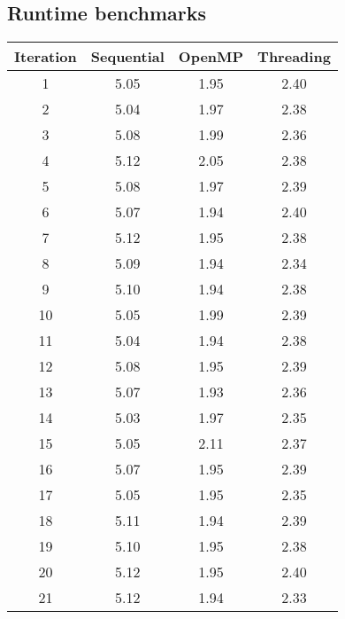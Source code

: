 \documentclass[a4paper]{article}
\begin{document}
        \subsection{Runtime benchmarks}
        \begin{minipage}{\textwidth}
            \centering
            \begin{tabular}{ c c c c }
                Iteration & Sequential & OpenMP & Threading \\
                \hline
                \hline
                        1 &       5.05 &   1.95 &      2.40 \\
                        2 &       5.04 &   1.97 &      2.38 \\
                        3 &       5.08 &   1.99 &      2.36 \\
                        4 &       5.12 &   2.05 &      2.38 \\
                        5 &       5.08 &   1.97 &      2.39 \\
                        6 &       5.07 &   1.94 &      2.40 \\
                        7 &       5.12 &   1.95 &      2.38 \\
                        8 &       5.09 &   1.94 &      2.34 \\
                        9 &       5.10 &   1.94 &      2.38 \\
                       10 &       5.05 &   1.99 &      2.39 \\
                       11 &       5.04 &   1.94 &      2.38 \\
                       12 &       5.08 &   1.95 &      2.39 \\
                       13 &       5.07 &   1.93 &      2.36 \\
                       14 &       5.03 &   1.97 &      2.35 \\
                       15 &       5.05 &   2.11 &      2.37 \\
                       16 &       5.07 &   1.95 &      2.39 \\
                       17 &       5.05 &   1.95 &      2.35 \\
                       18 &       5.11 &   1.94 &      2.39 \\
                       19 &       5.10 &   1.95 &      2.38 \\
                       20 &       5.12 &   1.95 &      2.40 \\
                       21 &       5.12 &   1.94 &      2.33 \\

\end{tabular}
\end{minipage}
\end{document}
